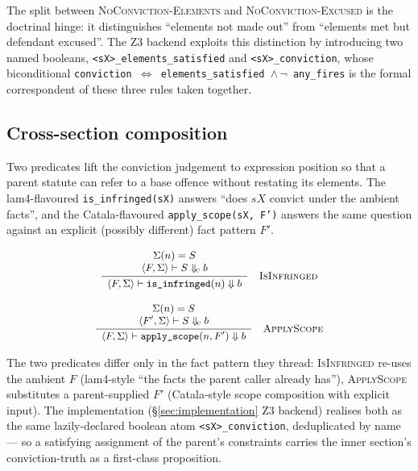 The split between \textsc{NoConviction-Elements} and
\textsc{NoConviction-Excused} is the doctrinal hinge: it
distinguishes ``elements not made out'' from ``elements met but
defendant excused''. The Z3 backend exploits this distinction by
introducing two named booleans, \texttt{<sX>\_elements\_satisfied}
and \texttt{<sX>\_conviction}, whose biconditional
\texttt{conviction $\Leftrightarrow$ elements\_satisfied $\land\,
\lnot$ any\_fires} is the formal correspondent of these three
rules taken together.

\subsection{Cross-section composition}
\label{subsec:semantics-cross-section}

Two predicates lift the conviction judgement to expression
position so that a parent statute can refer to a base offence
without restating its elements. The lam4-flavoured
\texttt{is\_infringed(sX)} answers ``does $sX$ convict under the
ambient facts'', and the Catala-flavoured
\texttt{apply\_scope(sX, F')} answers the same question against
an explicit (possibly different) fact pattern $F'$.

\begin{equation*}
\small
\inferrule[IsInfringed]
  {\Sigma(n) = S \\
   \langle F, \Sigma \rangle \vdash S \Downarrow_{\!\textsc{c}}
   b}
  {\langle F, \Sigma \rangle \vdash \texttt{is\_infringed}(n)
   \Downarrow b}
\end{equation*}

\begin{equation*}
\small
\inferrule[ApplyScope]
  {\Sigma(n) = S \\
   \langle F', \Sigma \rangle \vdash S \Downarrow_{\!\textsc{c}}
   b}
  {\langle F, \Sigma \rangle \vdash
   \texttt{apply\_scope}(n, F') \Downarrow b}
\end{equation*}

The two predicates differ only in the fact pattern they thread:
\textsc{IsInfringed} re-uses the ambient $F$ (lam4-style ``the
facts the parent caller already has''), \textsc{ApplyScope}
substitutes a parent-supplied $F'$ (Catala-style scope
composition with explicit input). The implementation
(\S\ref{sec:implementation} Z3 backend) realises both as the
same lazily-declared boolean atom
\texttt{<sX>\_conviction}, deduplicated by name --- so a
satisfying assignment of the parent's constraints carries the
inner section's conviction-truth as a first-class proposition.

